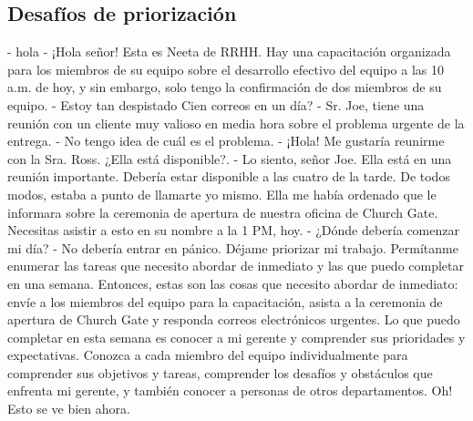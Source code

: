 \documentclass[10pt]{book}
\begin{document}
\subsection{Desafíos de priorización}
- hola
- ¡Hola señor! Esta es Neeta de RRHH. Hay una capacitación organizada para los miembros de su equipo sobre el desarrollo efectivo del equipo a las 10 a.m. de hoy, y sin embargo, solo tengo la confirmación de dos miembros de su equipo.
- Estoy tan despistado Cien correos en un día?
- Sr. Joe, tiene una reunión con un cliente muy valioso en media hora sobre el problema urgente de la entrega.
- No tengo idea de cuál es el problema.
- ¡Hola! Me gustaría reunirme con la Sra. Ross. ¿Ella está disponible?.
- Lo siento, señor Joe. Ella está en una reunión importante. Debería estar disponible a las cuatro de la tarde. De todos modos, estaba a punto de llamarte yo mismo. Ella me había ordenado que le informara sobre la ceremonia de apertura de nuestra oficina de Church Gate. Necesitas asistir a esto en su nombre a la 1 PM, hoy.
- ¿Dónde debería comenzar mi día?
- No debería entrar en pánico. Déjame priorizar mi trabajo. Permítanme enumerar las tareas que necesito abordar de inmediato y las que puedo completar en una semana. Entonces, estas son las cosas que necesito abordar de inmediato: envíe a los miembros del equipo para la capacitación, asista a la ceremonia de apertura de Church Gate y responda correos electrónicos urgentes. Lo que puedo completar en esta semana es conocer a mi gerente y comprender sus prioridades y expectativas. Conozca a cada miembro del equipo individualmente para comprender sus objetivos y tareas, comprender los desafíos y obstáculos que enfrenta mi gerente, y también conocer a personas de otros departamentos. Oh! Esto se ve bien ahora.
\end{document}
